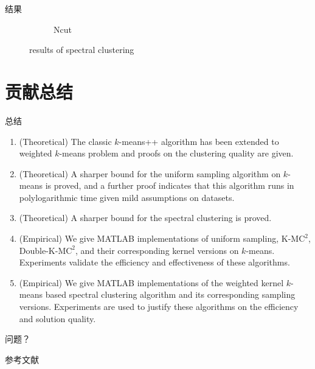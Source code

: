 \documentclass[notheorems]{beamer}
\begin{document}
\begin{CJK*}{UTF8}{gbsn}
\begin{frame}{结果}
{\begin{minipage}{1.0\linewidth}
\begin{figure}[H]
\begin{subfigure}{.49\linewidth}
					\caption{Ncut}
				\end{subfigure}
				\caption{results of spectral clustering}
				\label{fig: sp-experiments}
			\end{figure}
		\end{minipage}
	}
	
	
	
\end{frame}

\section{贡献总结}

\begin{frame}{总结}
	\begin{enumerate}
		\small
		\item (Theoretical) The classic $k$-­means++ algorithm has been extended to weighted $k$-­means problem and proofs on the clustering quality are given.
		\item (Theoretical) A sharper bound for the uniform sampling algorithm on $k$-means is proved, and a further proof indicates that this algorithm runs in polylogarithmic time given mild assumptions on datasets.
		\item (Theoretical) A sharper bound for the spectral clustering is proved.
		\item (Empirical) We give MATLAB implementations of uniform sampling, K-M$\text{C}^2$, Double-K-M$\text{C}^2$, and their corresponding kernel versions on $k$-means. Experiments validate the efficiency and effectiveness of these algorithms.
		\item (Empirical) We give MATLAB implementations of the weighted kernel $k$-means based spectral clustering algorithm and its corresponding sampling versions. Experiments are used to justify these algorithms on the efficiency and solution quality.
	\end{enumerate}
\end{frame}

\begin{frame}[plain,c]
\begin{center}
\Huge 问题？
\end{center}
\end{frame}

\begin{frame}{参考文献}
	\scriptsize
    
    
\end{frame}

\clearpage\end{CJK*}
\end{document}

